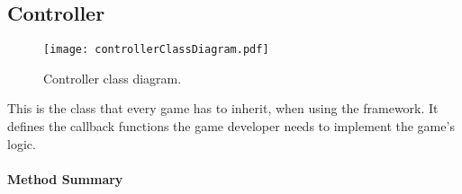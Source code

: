 \subsection{Controller}

\begin{figure}[h]
	\centering
	\texttt{[image: controllerClassDiagram.pdf]}
	\caption{Controller class diagram.}
	\label{img:controllerClassDiagram}
\end{figure}

\pagebreak

This is the class that every \gls{game} has to inherit, when using the \graphioli framework. It defines the callback functions the game developer needs to implement the game's logic. \\


\centerdash

\paragraph*{Method Summary}
